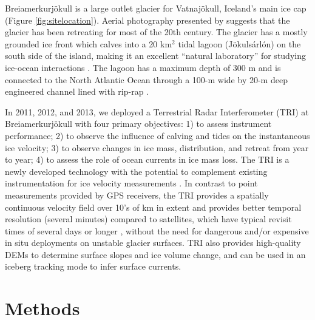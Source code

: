 \documentclass[review]{igs}
\begin{document}
Brei{\dh}amerkurjökull is a large outlet glacier for Vatnajökull, Iceland’s main ice cap (Figure \ref{fig:sitelocation}). Aerial photography presented by \citet{bjornsson2001jokulsarlon} suggests that the glacier has been retreating for most of the 20th century. The glacier has a mostly grounded ice front which calves into a 20 km$^2$ tidal lagoon (Jökulsárlón) on the south side of the island, making it an excellent “natural laboratory” for studying ice-ocean interactions \citep{howat2008dynamic}.  The lagoon has a maximum depth of 300 m and is connected to the North Atlantic Ocean through a 100-m wide by 20-m deep engineered channel lined with rip-rap \citep{bjornsson1996scales}. 

In 2011, 2012, and 2013, we deployed a Terrestrial Radar Interferometer (TRI) at Brei{\dh}amerkurjökull with four primary objectives: 1) to assess instrument performance; 2) to observe the influence of calving and tides on the instantaneous ice velocity; 3) to observe changes in ice mass, distribution, and retreat from year to year; 4) to assess the role of ocean currents in ice mass loss. The TRI is a newly developed technology with the potential to complement existing instrumentation for ice velocity measurements \citep{riesen2011short}. 
In contrast to point measurements provided by GPS receivers, the TRI provides a spatially continuous velocity field over 10's of km in extent and provides better temporal resolution (several minutes) compared to satellites, which have typical revisit times of several days or longer \citep{covello2010cosmo,werninghaus2010terrasar}, without the need for dangerous and/or expensive in situ deployments on unstable glacier surfaces. TRI also provides high-quality DEMs to determine surface slopes and ice volume change, and can be used in an iceberg tracking mode to infer surface currents. 



\section{Methods}
\end{document}
